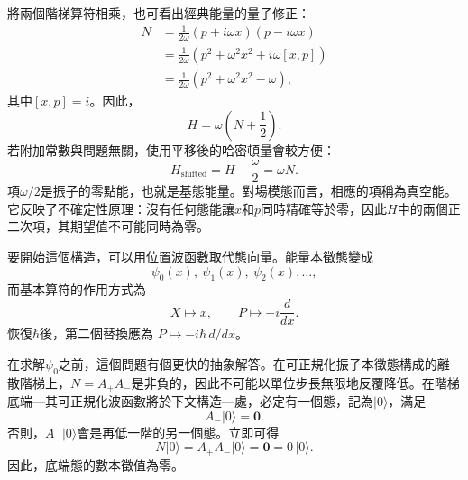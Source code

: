 將兩個階梯算符相乘，也可看出經典能量的量子修正：
\begin{align}
N
&=\frac{1}{2\omega}(p+i\omega x)(p-i\omega x)\\
&=\frac{1}{2\omega}\left(p^{2}+\omega^{2}x^{2}
 +i\omega[x,p]\right)\\
&=\frac{1}{2\omega}\left(p^{2}+\omega^{2}x^{2}-\omega\right),
\end{align}
其中\([x,p]=i\)。因此，
\begin{equation}
H=\omega\left(N+\frac12\right).
\end{equation}
若附加常數與問題無關，使用平移後的哈密頓量會較方便：
\begin{equation}
H_{\mathrm{shifted}}=H-\frac{\omega}{2}=\omega N.
\end{equation}
項\(\omega/2\)是振子的零點能，也就是基態能量。對場模態而言，相應的項稱為真空能。它反映了不確定性原理：沒有任何態能讓\(x\)和\(p\)同時精確等於零，因此\(H\)中的兩個正二次項，其期望值不可能同時為零。

\begin{classroomqa}
\end{classroomqa}

要開始這個構造，可以用位置波函數取代態向量。能量本徵態變成
\[
\psi_{0}(x),\ \psi_{1}(x),\ \psi_{2}(x),\ldots,
\]
而基本算符的作用方式為
\begin{equation}
X\longmapsto x,\qquad
P\longmapsto -i\frac{d}{dx}.
\end{equation}
恢復\(\hbar\)後，第二個替換應為
\(P\mapsto-i\hbar\,d/dx\)。

在求解\(\psi_{0}\)之前，這個問題有個更快的抽象解答。在可正規化振子本徵態構成的離散階梯上，\(N=A_{+}A_{-}\)是非負的，因此不可能以單位步長無限地反覆降低。在階梯底端---其可正規化波函數將於下文構造---處，必定有一個態，記為\(\lvert0\rangle\)，滿足
\begin{equation}
A_{-}\lvert0\rangle=\mathbf 0.
\end{equation}
否則，\(A_{-}\lvert0\rangle\)會是再低一階的另一個態。立即可得
\begin{equation}
N\lvert0\rangle
=A_{+}A_{-}\lvert0\rangle
=\mathbf 0
=0\,\lvert0\rangle.
\end{equation}
因此，底端態的數本徵值為零。

\begin{classroomqa}
\end{classroomqa}

